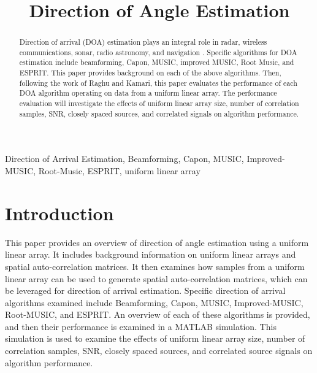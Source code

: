 \documentclass[conference]{IEEEtran}
\begin{document}
\title{Direction of Angle Estimation}

\author{
}
\maketitle

\begin{abstract}
	Direction of arrival (DOA) estimation plays an integral role in radar, wireless communications, sonar, radio astronomy, and navigation \cite{doa_algorithms_raghu}. Specific algorithms for DOA estimation include beamforming, Capon, MUSIC, improved MUSIC, Root Music, and ESPRIT. This paper provides background on each of the above algorithms. Then, following the work of Raghu and Kamari, this paper evaluates the performance of each DOA algorithm operating on data from a uniform linear array. The performance evaluation will investigate the effects of uniform linear array size, number of correlation samples, SNR, closely spaced sources, and correlated signals on algorithm performance.
\end{abstract}

\begin{IEEEkeywords}
Direction of Arrival Estimation, Beamforming, Capon, MUSIC, Improved-MUSIC, Root-Music, ESPRIT, uniform linear array
\end{IEEEkeywords}

	\section{Introduction}
	
	This paper provides an overview of direction of angle estimation using a uniform linear array. It includes background information on uniform linear arrays and spatial auto-correlation matrices. It then examines how samples from a uniform linear array can be used to generate spatial auto-correlation matrices, which can be leveraged for direction of arrival estimation. Specific direction of arrival algorithms examined include Beamforming, Capon, MUSIC, Improved-MUSIC, Root-MUSIC, and ESPRIT. An overview of each of these algorithms is provided, and then their performance is examined in a MATLAB simulation. This simulation is used to examine the effects of uniform linear array size, number of correlation samples, SNR, closely spaced sources, and correlated source signals on algorithm performance.
	 
\end{document}
